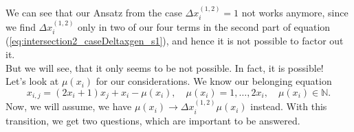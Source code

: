 We can see that our Ansatz from the case $\Delta x_{i}^{\left(1,2\right)} = 1$ not works anymore, since we find $\Delta x_{i}^{\left(1,2\right)}$ only in two of our four terms in the second part of equation (\ref{eq:intersection2_caseDeltaxgen_s1}), and hence it is not possible to factor out it.\\
But we will see, that it only seems to be not possible. In fact, it is possible!\\

Let's look at $\mu\left(x_{i}\right)$ for our considerations. We know our belonging equation
\[ x_{i,j} = \left(2x_{i} + 1\right)x_{j} + x_{i} - \mu\left(x_{i}\right), \quad \mu\left(x_{i}\right) = 1,\dots,2x_{i}, \quad \mu\left(x_{i}\right) \in \mathbb{N}. \]
Now, we will assume, we have $\mu\left(x_{i}\right) \rightarrow \Delta x_{i}^{\left(1,2\right)}\mu\left(x_{i}\right)$ instead. With this transition, we get two questions, which are important to be answered.
